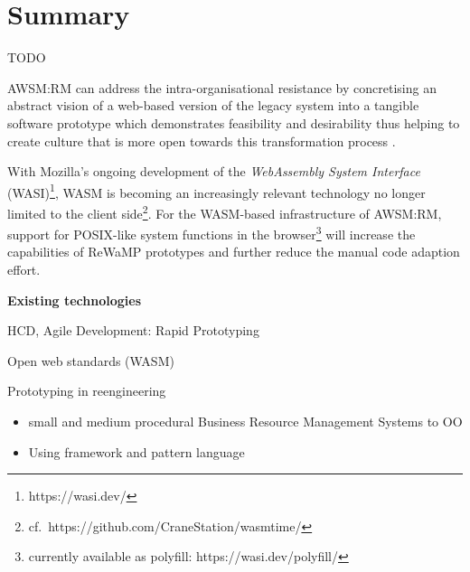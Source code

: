 \hypertarget{summary}{%
\section{Summary}\label{summary}}

TODO

AWSM:RM can address the intra-organisational resistance \autocite{Khadka2014ProfessionalsModernization,Sneed2010ReMiP} by concretising an abstract vision of a web-based version of the legacy system into a tangible software prototype which demonstrates feasibility and desirability thus helping to create culture that is more open towards this transformation process \autocite{Gartner2016Culture}.

With Mozilla's ongoing development of the \emph{WebAssembly System Interface} (WASI)\footnote{https://wasi.dev/}, WASM is becoming an increasingly relevant technology no longer limited to the client side\footnote{cf.~https://github.com/CraneStation/wasmtime/}.
For the WASM-based infrastructure of AWSM:RM, support for POSIX-like system functions in the browser\footnote{currently available as polyfill: https://wasi.dev/polyfill/} will increase the capabilities of ReWaMP prototypes and further reduce the manual code adaption effort.

\textbf{Existing technologies}

HCD, Agile Development: Rapid Prototyping

Open web standards (WASM)

Prototyping in reengineering \autocite{Cagnin2003}

\begin{itemize}
\tightlist
\item
  small and medium procedural Business Resource Management Systems to OO
\item
  Using framework and pattern language
\end{itemize}
